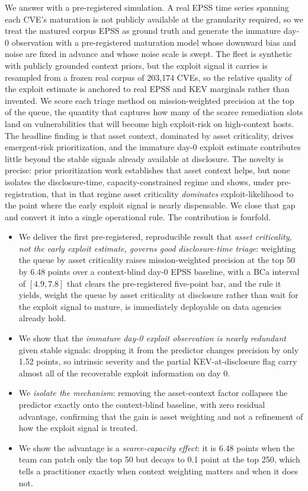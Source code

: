 \documentclass[journal]{IEEEtran}
\begin{document}
We answer with a pre-registered simulation. A real EPSS time series spanning each CVE's maturation
is not publicly available at the granularity required, so we treat the matured corpus EPSS as
ground truth and generate the immature day-0 observation with a pre-registered maturation model
whose downward bias and noise are fixed in advance and whose noise scale is swept. The fleet is
synthetic with publicly grounded context priors, but the exploit signal it carries is resampled
from a frozen real corpus of 203{,}174 CVEs, so the relative quality of the exploit estimate is
anchored to real EPSS and KEV marginals rather than invented. We score each triage method on
mission-weighted precision at the top of the queue, the quantity that captures how many of the
scarce remediation slots land on vulnerabilities that will become high exploit-risk on high-context
hosts. The headline finding is that asset context, dominated by asset criticality, drives
emergent-risk prioritization, and the immature day-0 exploit estimate contributes little beyond the
stable signals already available at disclosure. The novelty is precise: prior prioritization work
establishes that asset context helps, but none isolates the disclosure-time, capacity-constrained
regime and shows, under pre-registration, that in that regime asset criticality \emph{dominates}
exploit-likelihood to the point where the early exploit signal is nearly dispensable. We close that
gap and convert it into a single operational rule. The contribution is fourfold.

\begin{itemize}
\item We deliver the first pre-registered, reproducible result that \emph{asset criticality, not
the early exploit estimate, governs good disclosure-time triage}: weighting the queue by asset
criticality raises mission-weighted precision at the top 50 by 6.48 points over a context-blind
day-0 EPSS baseline, with a BCa interval of $[4.9, 7.8]$ that clears the pre-registered five-point
bar, and the rule it yields, weight the queue by asset criticality at disclosure rather than wait
for the exploit signal to mature, is immediately deployable on data agencies already hold.
\item We show that the \emph{immature day-0 exploit observation is nearly redundant} given stable
signals: dropping it from the predictor changes precision by only 1.52 points, so intrinsic
severity and the partial KEV-at-disclosure flag carry almost all of the recoverable exploit
information on day 0.
\item We \emph{isolate the mechanism}: removing the asset-context factor collapses the predictor
exactly onto the context-blind baseline, with zero residual advantage, confirming that the gain is
asset weighting and not a refinement of how the exploit signal is treated.
\item We show the advantage is a \emph{scarce-capacity effect}: it is 6.48 points when the team can
patch only the top 50 but decays to 0.1 point at the top 250, which tells a practitioner exactly
when context weighting matters and when it does not.
\end{itemize}
\end{document}
